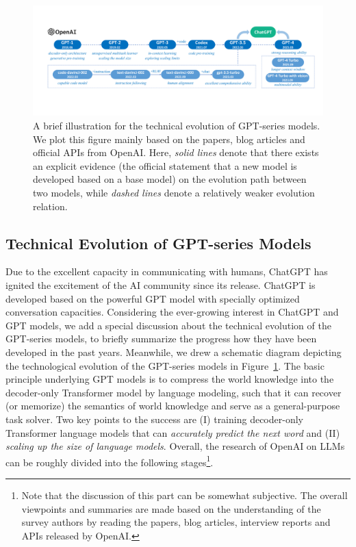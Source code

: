 \begin{figure}[h]
    \centering
    \includegraphics[width=\textwidth]{images/openai-v2.pdf}
    \caption{A brief  illustration for the technical evolution of GPT-series models. We plot this figure mainly based on the papers, blog articles and official APIs from OpenAI. Here,  \emph{solid lines}  denote that there exists an explicit evidence (\eg the official statement that a new model is developed based on a base model) on the evolution path between two models, while \emph{dashed lines} denote a relatively weaker evolution relation. }
    \label{fig:openai}
\end{figure}


\subsection{Technical Evolution  of GPT-series Models}\label{sec-GPT-series}

Due to the  excellent capacity in communicating  with humans,  ChatGPT has ignited the excitement of the AI community since its release.   
ChatGPT is developed based on the powerful GPT model with specially optimized conversation  capacities.   
Considering the ever-growing interest in ChatGPT and GPT models, we add a special discussion about the technical evolution of the GPT-series models, to briefly summarize the progress how they have been developed in the past years. %
{Meanwhile, we drew a schematic diagram depicting the technological evolution of the GPT-series models in Figure~\ref{fig:openai}.} 
The basic principle underlying GPT models is to compress the world knowledge into the decoder-only Transformer model by language modeling,  such that it can  recover (or memorize) the semantics of world knowledge and serve as a general-purpose task solver. Two key points to the success are  (I)   training decoder-only Transformer language models that can \emph{accurately predict the next word}  and (II) \emph{scaling  up the size of  language models}.   
Overall, the research of OpenAI on LLMs can be roughly divided into the following stages\footnote{Note that the discussion of this part can be somewhat subjective. The overall viewpoints and summaries are made based on the understanding of the survey authors by reading  the papers, blog articles, interview reports and APIs released by OpenAI.  }.  

